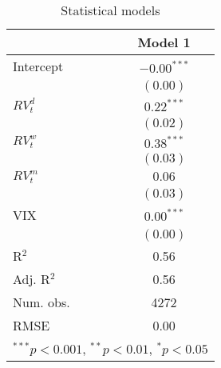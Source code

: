 
\begin{table}
\begin{center}
\begin{tabular}{l c }
\hline
 & Model 1 \\
\hline
Intercept    & $-0.00^{***}$ \\
             & $(0.00)$      \\
$RV_{t}^{d}$ & $0.22^{***}$  \\
             & $(0.02)$      \\
$RV_{t}^{w}$ & $0.38^{***}$  \\
             & $(0.03)$      \\
$RV_{t}^{m}$ & $0.06$        \\
             & $(0.03)$      \\
VIX          & $0.00^{***}$  \\
             & $(0.00)$      \\
\hline
R$^2$        & 0.56          \\
Adj. R$^2$   & 0.56          \\
Num. obs.    & 4272          \\
RMSE         & 0.00          \\
\hline
\multicolumn{2}{l}{\scriptsize{$^{***}p<0.001$, $^{**}p<0.01$, $^*p<0.05$}}
\end{tabular}
\caption{Statistical models}
\label{table:coefficients}
\end{center}
\end{table}
